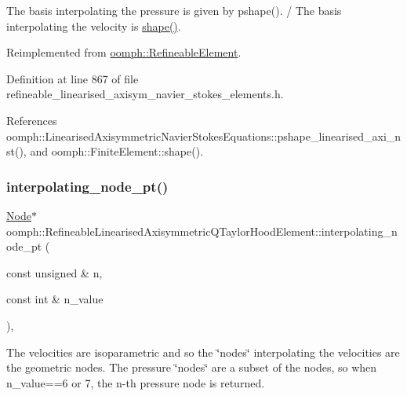 The basis interpolating the pressure is given by pshape(). / The basis interpolating the velocity is \hyperlink{classoomph_1_1FiniteElement_a58a25b6859ddd43b7bfe64a19fee5023}{shape()}. 



Reimplemented from \hyperlink{classoomph_1_1RefineableElement_a8ca420443c28708e5c6315a80f520137}{oomph\+::\+Refineable\+Element}.



Definition at line 867 of file refineable\+\_\+linearised\+\_\+axisym\+\_\+navier\+\_\+stokes\+\_\+elements.\+h.



References oomph\+::\+Linearised\+Axisymmetric\+Navier\+Stokes\+Equations\+::pshape\+\_\+linearised\+\_\+axi\+\_\+nst(), and oomph\+::\+Finite\+Element\+::shape().

\mbox{\label{classoomph_1_1RefineableLinearisedAxisymmetricQTaylorHoodElement_a56710b2dff77c32e1ca90de31f699902}} 
\subsubsection{\texorpdfstring{interpolating\+\_\+node\+\_\+pt()}{interpolating\_node\_pt()}}
{\footnotesize\ttfamily \hyperlink{classoomph_1_1Node}{Node}$\ast$ oomph\+::\+Refineable\+Linearised\+Axisymmetric\+Q\+Taylor\+Hood\+Element\+::interpolating\+\_\+node\+\_\+pt (\begin{DoxyParamCaption}\item[{const unsigned \&}]{n,  }\item[{const int \&}]{n\+\_\+value }\end{DoxyParamCaption})\hspace{0.3cm}{\ttfamily [inline]}, {\ttfamily [virtual]}}



The velocities are isoparametric and so the \char`\"{}nodes\char`\"{} interpolating the velocities are the geometric nodes. The pressure \char`\"{}nodes\char`\"{} are a subset of the nodes, so when n\+\_\+value==6 or 7, the n-\/th pressure node is returned. 



